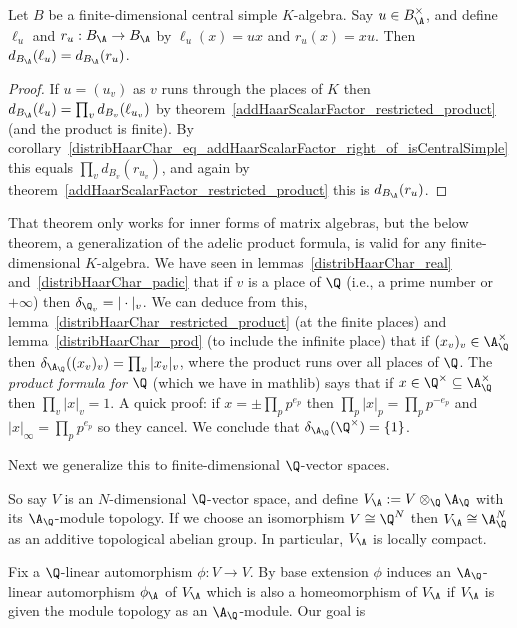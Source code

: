 \begin{theorem}
  \label{addHaarScalarFactor.left_mul_eq_right_mul}
  Let $B$ be a finite-dimensional central simple $K$-algebra.
  Say $u\in B_{\A}^\times$, and define $\ell_u$ and $r_u:B_{\A}\to B_{\A}$ by
  $\ell_u(x)=ux$ and $r_u(x)=xu$. Then $d_{B_{\A}}(\ell_u)=d_{B_{\A}}(r_u)$.
\end{theorem}
\begin{proof} If $u=(u_v)$ as $v$ runs through the places of $K$ then
  $d_{B_{\A}}(\ell_u)=\prod_v d_{B_v}(\ell_{u_v})$ by
  theorem~\ref{addHaarScalarFactor_restricted_product} (and the product is finite).
  By corollary~\ref{distribHaarChar_eq_addHaarScalarFactor_right_of_isCentralSimple}
  this equals $\prod_v d_{B_v}(r_{u_v})$, and again by
  theorem~\ref{addHaarScalarFactor_restricted_product} this is $d_{B_{\A}}(r_u)$.
\end{proof}

That theorem only works for inner forms of matrix algebras, but the below theorem,
a generalization of the adelic product formula, is valid for any finite-dimensional
$K$-algebra.
We have seen in lemmas~\ref{distribHaarChar_real} and~\ref{distribHaarChar_padic}
  that if $v$ is a place of $\Q$ (i.e., a prime
  number or $+\infty$) then $\delta_{\Q_v}=|\cdot|_v$.
  We can deduce from this, lemma~\ref{distribHaarChar_restricted_product} (at the finite places)
  and lemma~\ref{distribHaarChar_prod} (to include the infinite place) that if $(x_v)_v\in\A_{\Q}^\times$
  then $\delta_{\A_{\Q}}((x_v)_v)=\prod_v|x_v|_v$, where the product
  runs over all places of $\Q$.
  The \emph{product formula for $\Q$} (which we have in mathlib) says
  that if $x\in\Q^\times\subseteq\A_{\Q}^\times$ then $\prod_v|x|_v=1.$
  A quick proof: if $x=\pm\prod_pp^{e_p}$ then $\prod_p|x|_p=\prod_pp^{-e_p}$
  and $|x|_\infty=\prod_pp^{e_p}$ so they cancel. We conclude that $\delta_{\A_{\Q}}(\Q^\times)=\{1\}$.

  Next we generalize this to finite-dimensional $\Q$-vector spaces.

  So say $V$ is an $N$-dimensional $\Q$-vector space,
  and define $V_{\A}:= V\otimes_{\Q}\A_{\Q}$ with its $\A_{\Q}$-module topology.
  If we choose an isomorphism $V\cong\Q^N$ then $V_{\A}\cong\A_{\Q}^N$
  as an additive topological abelian group. In particular, $V_{\A}$ is locally compact.

  Fix a $\Q$-linear automorphism $\phi:V\to V$. By base extension $\phi$ induces
  an $\A_{\Q}$-linear automorphism $\phi_{\A}$ of $V_{\A}$ which is also a homeomorphism of $V_{\A}$
  if $V_{\A}$ is given the module topology as an $\A_{\Q}$-module. Our goal is

